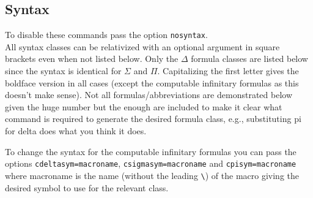 \documentclass[leqno,11pt]{amsart}
\begin{document}
\subsection{Syntax}
To disable these commands pass the option \verb=nosyntax=.\\  All syntax classes can be relativized with an optional argument in square brackets even when not listed below.  Only the \( \Delta \) formula classes are listed below since the syntax is identical for \( \Sigma \) and \( \Pi \).  Capitalizing the first letter gives the boldface version in all cases (except the computable infinitary formulas as this doesn't make sense).  Not all formulas/abbreviations are demonstrated below given the huge number but the enough are included to make it clear what command is required to generate the desired formula class, e.g., substituting pi for delta does what you think it does.

To change the syntax for the computable infinitary formulas you can pass the options \verb!cdeltasym=macroname!, \verb!csigmasym=macroname! and \verb!cpisym=macroname! where macroname is the name (without the leading \verb=\=) of the macro giving the desired symbol to use for the relevant class. 
\end{document}
